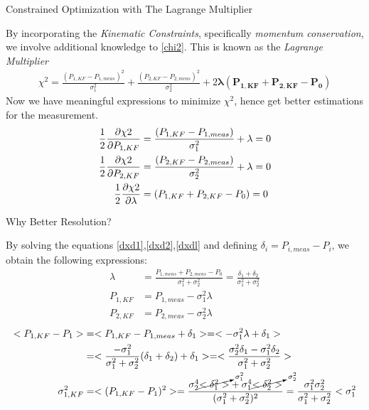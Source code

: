 \documentclass[
	xcolor=dvipsnames,
	aspectratio=169,	
	10pt, 
	]{beamer}
\begin{document}
\begin{frame}{Constrained Optimization with The Lagrange Multiplier}
	\begin{block}{}
		By incorporating the \textit{Kinematic Constraints}, specifically \textit{momentum conservation}, we involve additional knowledge to \eqref{chi2}. This is known as the \textit{Lagrange Multiplier}
		\begin{align}
			\chi^2= \frac{(P_{1,KF}-P_{1,meas})^2}{\sigma_1^2}+\frac{(P_{2,KF}-P_{2,meas})^2}{\sigma_2^2} + 2\mathbf{\lambda(P_{1,KF}+P_{2,KF}-P_0)}\label{LagMulti}
		\end{align} 
		Now we have meaningful expressions to minimize $\chi^2$, hence get better estimations for the measurement.
		\begin{align}
			\frac{1}{2}\frac{\partial \chi2}{\partial P_{1,KF}}&=\frac{(P_{1,KF}-P_{1,meas})}{\sigma_1^2}+\lambda=0\label{dxd1}\\
			\frac{1}{2}\frac{\partial \chi2}{\partial P_{2,KF}}&=\frac{(P_{2,KF}-P_{2,meas})}{\sigma_2^2}+\lambda=0\label{dxd2}
			\\
			\frac{1}{2}\frac{\partial \chi2}{\partial \lambda}&=(P_{1,KF}+P_{2,KF}-P_0)=0\label{dxdl}
		\end{align}
	\end{block}
\end{frame}
\begin{frame}{Why Better Resolution?}
	\begin{block}{}
		By solving the equations \ref{dxd1},\ref{dxd2},\ref{dxdl} and defining $\delta_i = P_{i,meas} - P_i$, we obtain the following expressions:
		\begin{align}
			\lambda&=\frac{P_{1,meas}+P_{2,meas}-P_0}{\sigma_1^2+\sigma_2^2} = \frac{\delta_1 + \delta_2}{\sigma_1^2+\sigma_2^2}\\
			P_{1,KF}&=P_{1,meas}-\sigma_1^2\lambda\\
			P_{2,KF}&=P_{2,meas}-\sigma_2^2\lambda
		\end{align}
		\begin{align}
		<P_{1,KF}-P_{1}>& =<P_{1,KF}-P_{1,meas}+\delta_{1}>  = <-\sigma_1^2\lambda+\delta_1>\nonumber\\
		&=<\frac{-\sigma_1^2}{\sigma_1^2+\sigma_2^2}(\delta_{1}+\delta_{2})+\delta_1>=<\frac{\sigma_2^2\delta_1 -\sigma_1^2\delta_2}{\sigma_1^2+\sigma_2^2}> \\
		\sigma_{1,KF}^2 &= <(P_{1,KF}- P_1)^2> =\frac{\sigma_2^4\cancelto{\sigma_1^2}{<\delta_1^2>}+\sigma_1^4\cancelto{\sigma_2^2}{<\delta_2^2>}}{(\sigma_1^2+\sigma_2^2)^2} = \frac{\sigma_1^2\sigma_2^2}{\sigma_1^2+\sigma_2^2}<\sigma_1^2
	\end{align}
	\end{block}
\end{frame}
\end{document}
